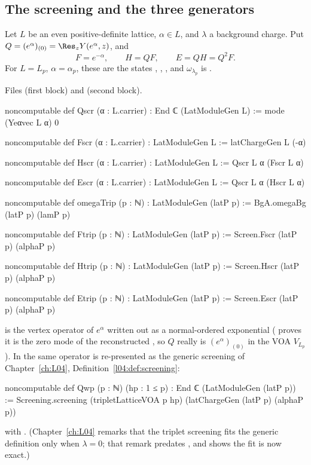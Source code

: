\subsection{The screening and the three generators}

\begin{definition}[Screening, $F$, $H$, $E$]\label{l18:def:screen}
Let $L$ be an even positive-definite lattice, $\alpha\in L$, and $\lambda$ a background charge. Put
$Q=(e^\alpha)_{(0)}=\Res_z Y(e^\alpha,z)$, and
\begin{equation*}
F=e^{-\alpha},\qquad H=QF,\qquad E=QH=Q^2F .
\end{equation*}
For $L=L_p$, $\alpha=\alpha_p$, these are the states , , , and
$\omega_{\lambda_p}$ is .
\end{definition}
\noindent Files  (first block) and
 (second block).
\begin{leancode}
noncomputable def Qscr (α : L.carrier) : End ℂ (LatModuleGen L) := mode (Yeαvec L α) 0

noncomputable def Fscr (α : L.carrier) : LatModuleGen L := latChargeGen L (-α)

noncomputable def Hscr (α : L.carrier) : LatModuleGen L := Qscr L α (Fscr L α)

noncomputable def Escr (α : L.carrier) : LatModuleGen L := Qscr L α (Hscr L α)
\end{leancode}
\begin{leancode}
noncomputable def omegaTrip (p : ℕ) : LatModuleGen (latP p) :=
  BgA.omegaBg (latP p) (lamP p)

noncomputable def Ftrip (p : ℕ) : LatModuleGen (latP p) :=
  Screen.Fscr (latP p) (alphaP p)

noncomputable def Htrip (p : ℕ) : LatModuleGen (latP p) :=
  Screen.Hscr (latP p) (alphaP p)

noncomputable def Etrip (p : ℕ) : LatModuleGen (latP p) :=
  Screen.Escr (latP p) (alphaP p)
\end{leancode}
\begin{dictionary}
 is the vertex operator of $e^\alpha$ written out as a normal-ordered exponential
( proves it is the zero mode of the reconstructed , so
$Q$ really is $(e^\alpha)_{(0)}$ in the VOA $V_{L_p}$). In  the same operator is
re-presented as the generic screening of Chapter~\ref{ch:L04}, Definition~\ref{l04:def:screening}:
\begin{leancode}
noncomputable def Qwp (p : ℕ) (hp : 1 ≤ p) : End ℂ (LatModuleGen (latP p)) :=
  Screening.screening (tripletLatticeVOA p hp) (latChargeGen (latP p) (alphaP p))
\end{leancode}
with . (Chapter~\ref{ch:L04} remarks that the triplet screening fits the generic
definition only when $\lambda=0$; that remark predates , and 
shows the fit is now exact.)
\end{dictionary}
